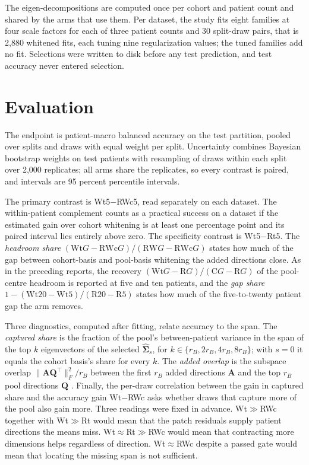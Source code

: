 \documentclass[11pt]{article}
\begin{document}
\noindent The eigen-decompositions are computed once per cohort and patient count and shared by the arms that use them. Per dataset, the study fits eight families at four scale factors for each of three patient counts and 30 split-draw pairs, that is 2,880 whitened fits, each tuning nine regularization values; the tuned families add no fit. Selections were written to disk before any test prediction, and test accuracy never entered selection.

\section{Evaluation}
\label{sec:evaluation}
The endpoint is patient-macro balanced accuracy on the test partition, pooled over splits and draws with equal weight per split. Uncertainty combines Bayesian bootstrap weights on test patients \citep{rubin1981bayesian} with resampling of draws within each split over 2,000 replicates; all arms share the replicates, so every contrast is paired, and intervals are 95 percent percentile intervals.

The primary contrast is Wt5$-$RWc5, read separately on each dataset. The within-patient complement counts as a practical success on a dataset if the estimated gain over cohort whitening is at least one percentage point and its paired interval lies entirely above zero. The specificity contrast is Wt5$-$Rt5. The \emph{headroom share} $(\mathrm{Wt}G-\mathrm{RWc}G)/(\mathrm{RW}G-\mathrm{RWc}G)$ states how much of the gap between cohort-basis and pool-basis whitening the added directions close. As in the preceding reports, the recovery $(\mathrm{Wt}G-\mathrm RG)/(\mathrm CG-\mathrm RG)$ of the pool-centre headroom is reported at five and ten patients, and the \emph{gap share} $1-(\mathrm{Wt}20-\mathrm{Wt}5)/(\mathrm R20-\mathrm R5)$ states how much of the five-to-twenty patient gap the arm removes.

Three diagnostics, computed after fitting, relate accuracy to the span. The \emph{captured share} is the fraction of the pool's between-patient variance in the span of the top $k$ eigenvectors of the selected $\hat{\boldsymbol\Sigma}_s$, for $k\in\{r_B,2r_B,4r_B,8r_B\}$; with $s=0$ it equals the cohort basis's share for every $k$. The \emph{added overlap} is the subspace overlap $\lVert\mathbf A\mathbf Q^\top\rVert_F^2/r_B$ between the first $r_B$ added directions $\mathbf A$ and the top $r_B$ pool directions $\mathbf Q$ \citep{queisler2026spectrumRegularization}. Finally, the per-draw correlation between the gain in captured share and the accuracy gain Wt$-$RWc asks whether draws that capture more of the pool also gain more. Three readings were fixed in advance. Wt$\gg$RWc together with Wt$\gg$Rt would mean that the patch residuals supply patient directions the means miss. Wt$\approx$Rt$\gg$RWc would mean that contracting more dimensions helps regardless of direction. Wt$\approx$RWc despite a passed gate would mean that locating the missing span is not sufficient.





\end{document}
